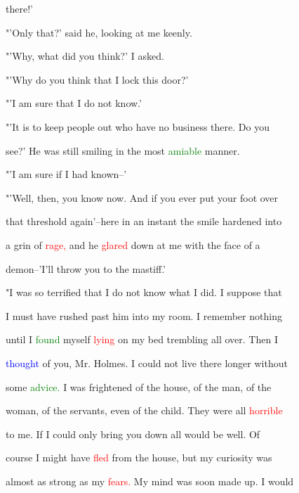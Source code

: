  there!'



 "'Only that?' said he, looking at me keenly.



 "'Why, what did you think?' I asked.



 "'Why do you think that I lock this door?'



 "'I am sure that I do not know.'



 "'It is to keep people out who have no business there. Do you

 see?' He was still \textcolor{BurntOrange}{smiling} in the most \textcolor{green}{amiable} manner.



 "'I am sure if I had known--'



 "'Well, then, you know now. And if you ever put your foot over

 that threshold again'--here in an instant the \textcolor{BurntOrange}{smile} hardened into

 a \textcolor{BurntOrange}{grin} of \textcolor{red}{rage,} and he \textcolor{red}{glared} down at me with the face of a

 demon--'I'll throw you to the mastiff.'



 "I was so terrified that I do not know what I did. I suppose that

 I must have rushed past him into my room. I remember nothing

 until I \textcolor{green}{found} myself \textcolor{red}{lying} on my bed trembling all over. Then I

 \textcolor{blue}{thought} of you, Mr. Holmes. I could not live there longer without

 some \textcolor{green}{advice.} I was \textcolor{BurntOrange}{frightened} of the house, of the man, of the

 woman, of the \textcolor{BurntOrange}{servants,} even of the \textcolor{BurntOrange}{child.} They were all \textcolor{red}{horrible}

 to me. If I could only bring you down all would be well. Of

 course I might have \textcolor{red}{fled} from the house, but my \textcolor{BurntOrange}{curiosity} was

 almost as strong as my \textcolor{red}{fears.} My mind was soon made up. I would

